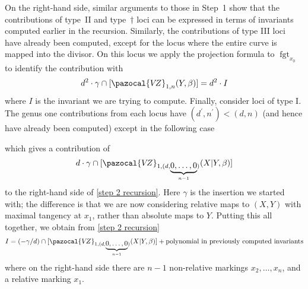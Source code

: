 \documentclass[11pt]{amsart}
\newcommand{\sqC}{\scalebox{0.8}[1.3]{$\sqsubset$}}
\newcommand{\VZ}{\pazocal{V\!Z}}
\newcommand{\fgt}{\operatorname{fgt}}
\theoremstyle{definition}
\theoremstyle{definition}
\begin{document}
On the right-hand side, similar arguments to those in Step~1 show that the contributions of type~II and type~$\dag$ loci can be expressed in terms of invariants computed earlier in the recursion. Similarly, the contributions of type III loci have already been computed, except for the locus where the entire curve is mapped into the divisor. On this locus we apply the projection formula to $\fgt_{x_0}$ to identify the contribution with
\begin{equation*} d^2 \cdot \gamma \cap [\VZ_{1,n}(Y,\beta)] = d^2 \cdot I \end{equation*}
where $I$ is the invariant we are trying to compute. Finally, consider loci of type I. The genus one contributions from each locus have $(d^\prime,n^\prime) < (d,n)$ (and hence have already been computed) except in the following case
\begin{center}
\end{center}
which gives a contribution of
\begin{equation*} d\cdot \gamma \cap [\VZ_{1,(d,\underbrace{0,\ldots,0}_{n-1})}(X|Y,\beta)]\end{equation*}
to the right-hand side of \eqref{step 2 recursion}. Here $\gamma$ is the insertion we started with; the difference is that we are now considering relative maps to $(X,Y)$ with maximal tangency at $x_1$, rather than absolute maps to $Y$. Putting this all together, we obtain from \eqref{step 2 recursion}
\begin{equation}\label{step 2 recursion 2} I = (-\gamma/d) \cap [\VZ_{1,(d,\underbrace{0,\ldots,0}_{n-1})}(X|Y,\beta)] + \text{polynomial in previously computed invariants} \end{equation}
where on the right-hand side there are $n-1$ non-relative markings $x_2,\ldots,x_n$, and a relative marking $x_1$.\medskip
\end{document}

